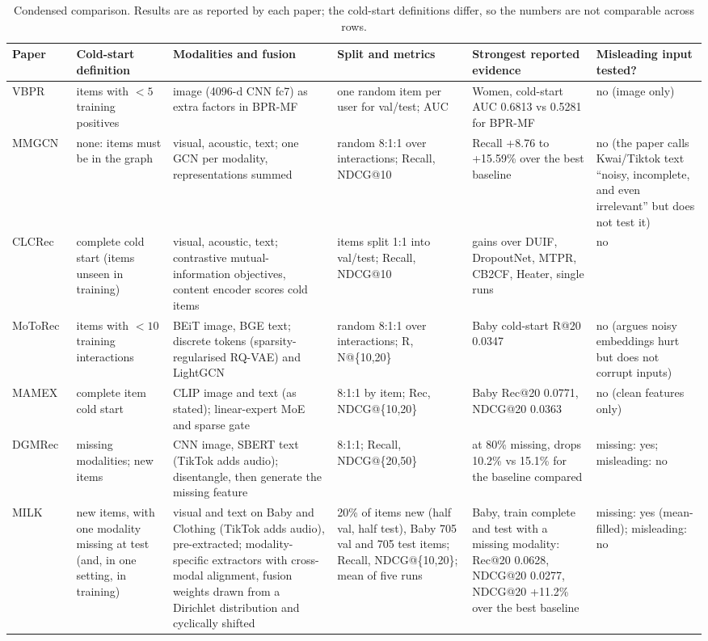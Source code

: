 \documentclass[conference]{IEEEtran}
\begin{document}
\begin{table}[!t]
\centering\footnotesize
\caption{Condensed comparison. Results are as reported by each paper; the cold-start definitions differ, so the numbers are not comparable across rows.}
\label{tab:lit}
\renewcommand{\arraystretch}{1.15}
\begin{tabularx}{\textwidth}{@{}p{1.9cm}p{2.5cm}XXXp{2.4cm}@{}}
\toprule
Paper & Cold-start definition & Modalities and fusion & Split and metrics & Strongest reported evidence & Misleading input tested? \\
\midrule
VBPR~\cite{he2016vbpr} & items with $<5$ training positives & image (4096-d CNN fc7) as extra factors in BPR-MF & one random item per user for val/test; AUC & Women, cold-start AUC 0.6813 vs 0.5281 for BPR-MF & no (image only) \\
MMGCN~\cite{wei2019mmgcn} & none: items must be in the graph & visual, acoustic, text; one GCN per modality, representations summed & random 8:1:1 over interactions; Recall, NDCG@10 & Recall +8.76 to +15.59\% over the best baseline & no (the paper calls Kwai/Tiktok text ``noisy, incomplete, and even irrelevant'' but does not test it) \\
CLCRec~\cite{wei2021clcrec} & complete cold start (items unseen in training) & visual, acoustic, text; contrastive mutual-information objectives, content encoder scores cold items & items split 1:1 into val/test; Recall, NDCG@10 & gains over DUIF, DropoutNet, MTPR, CB2CF, Heater, single runs & no \\
MoToRec~\cite{liu2026motorec} & items with $<10$ training interactions & BEiT image, BGE text; discrete tokens (sparsity-regularised RQ-VAE) and LightGCN & random 8:1:1 over interactions; R, N@\{10,20\} & Baby cold-start R@20 0.0347 & no (argues noisy embeddings hurt but does not corrupt inputs) \\
MAMEX~\cite{nguyen2025mamex} & complete item cold start & CLIP image and text (as stated); linear-expert MoE and sparse gate & 8:1:1 by item; Rec, NDCG@\{10,20\} & Baby Rec@20 0.0771, NDCG@20 0.0363 & no (clean features only) \\
DGMRec~\cite{kim2025dgmrec} & missing modalities; new items & CNN image, SBERT text (TikTok adds audio); disentangle, then generate the missing feature & 8:1:1; Recall, NDCG@\{20,50\} & at 80\% missing, drops 10.2\% vs 15.1\% for the baseline compared & missing: yes; misleading: no \\
MILK~\cite{bai2024milk} & new items, with one modality missing at test (and, in one setting, in training) & visual and text on Baby and Clothing (TikTok adds audio), pre-extracted; modality-specific extractors with cross-modal alignment, fusion weights drawn from a Dirichlet distribution and cyclically shifted & 20\% of items new (half val, half test), Baby 705 val and 705 test items; Recall, NDCG@\{10,20\}; mean of five runs & Baby, train complete and test with a missing modality: Rec@20 0.0628, NDCG@20 0.0277, NDCG@20 +11.2\% over the best baseline & missing: yes (mean-filled); misleading: no \\
\bottomrule
\end{tabularx}
\end{table}
\end{document}
